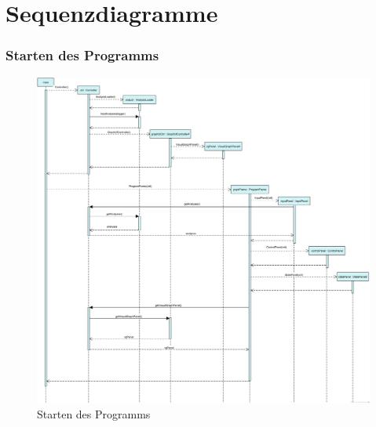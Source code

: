 
\part{Sequenzdiagramme}

\section*{Starten des Programms}
\begin{figure}[H]
  \centering
    \includegraphics[width=1\textwidth]{Sequenzdiagramme/ProgramStart}
  \caption{Starten des Programms}
  \label{fig:start}
\end{figure}
\FloatBarrier
\clearpage


